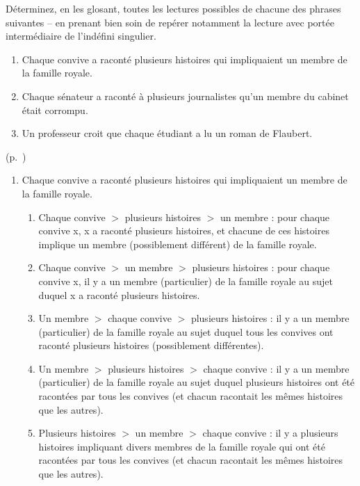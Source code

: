 \begin{exo}\label{exo:3portee}
Déterminez, en les glosant, 
toutes les lectures possibles de chacune des phrases suivantes -- en prenant bien soin de repérer notamment la lecture avec portée intermédiaire de l'indéfini singulier.
\begin{enumerate}
\item
Chaque convive a raconté plusieurs histoires qui impliquaient un
membre de la famille royale.
\item
Chaque sénateur a raconté à plusieurs journalistes qu'un membre du
cabinet était corrompu.
\item 
Un professeur croit que chaque étudiant a lu un roman de Flaubert.
\end{enumerate}
\begin{solu}(p.~\pageref{exo:3portee})\label{crg:3portee}
\begin{enumerate}
\item
Chaque convive a raconté plusieurs histoires qui impliquaient un
membre de la famille royale.

\begin{enumerate}
\item Chaque convive $>$ plusieurs histoires $>$ un membre : 
pour chaque convive \Obj x, \Obj x a raconté plusieurs histoires, et chacune de ces histoires implique un membre (possiblement différent) de la famille royale.

\item Chaque convive $>$ un membre $>$ plusieurs histoires : 
pour chaque convive \Obj x, il y a un membre (particulier) de la famille royale au sujet duquel \Obj x a raconté plusieurs histoires.

\item Un membre $>$ chaque convive $>$ plusieurs histoires : 
il y a un membre (particulier) de la famille royale au sujet duquel tous les convives ont raconté plusieurs histoires (possiblement différentes). 

\item Un membre $>$ plusieurs histoires $>$ chaque convive : 
il y a un membre (particulier) de la famille royale au sujet duquel plusieurs histoires ont été racontées par tous les convives (et chacun racontait les mêmes histoires que les autres).

\item Plusieurs histoires $>$ un membre $>$ chaque convive : 
il y a plusieurs histoires impliquant divers membres de la famille royale qui ont été racontées par tous les convives (et chacun racontait les mêmes histoires que les autres).


\end{enumerate}
\end{enumerate}
\end{solu}
\end{exo}
